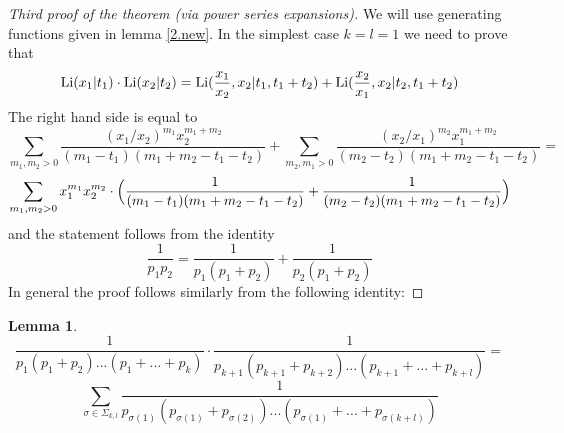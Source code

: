 \documentclass[10pt]{article}
\newtheorem{lemma}[theorem]{Lemma}
\begin{document}
\begin{proof}[Third proof of the theorem (via power series expansions)]  We 
will use generating functions given in lemma \ref{2.new}.  In the simplest case $ k=l=1$  we need to prove that
$$
{\rm Li}(x_1|t_1) \cdot {\rm Li}(x_2|t_2) = {\rm Li}(\frac{x_1}{x_2},x_2|t_1,t_1+t_2) + {\rm Li}(\frac{x_2}{x_1},x_2|t_2,t_1+t_2) 
$$
The right hand side is equal to
$$
\sum_{m_1,m_2 >0}\frac{(x_1/x_2)^{m_1}x_2^{m_1 + m_2}}{(m_1 -t_1)(m_1 + m_2 - t_1 -t_2)} + 
\sum_{m_2,m_1 >0}\frac{(x_2/x_1)^{m_2}x_1^{m_1 + m_2}}{(m_2 -t_2)(m_1 + m_2 - t_1 -t_2)} =
$$
$$
\sum_{m_1,m_2 >0}x_1^{m_1}x_2^{m_2} \cdot \Bigl(\frac{1}{(m_1 -t_1)(m_1 + m_2 - t_1 -t_2)} + \frac{1}{(m_2 -t_2 )(m_1 + m_2 - t_1 -t_2)}\Bigr)
$$
and the statement follows from the identity
$$
\frac{1}{p_1p_2} = \frac{1}{p_1( p_1 + p_2)} + \frac{1}{p_2( p_1 + p_2) }
$$
In general the proof follows similarly from the following identity:


\end{proof}

\begin{lemma}
\begin{equation} \label{A3}
\frac{1}{p_1( p_1 + p_2) ... ( p_1 + ... + p_k)} \cdot \frac{1}{p_{k+1}( p_{k+1}  + p_{k+2}) ... ( p_{k+1}   + ... + p_{k+l})} = 
\end{equation} 
$$
\sum_{\sigma \in \Sigma_{k,l}} \frac{1}{p_{\sigma(1)}( p_{\sigma(1)} + p_{\sigma(2)} ) ... ( p_{\sigma(1)} + ... + p_{\sigma(k+l)} )}
$$
\end{lemma}
\end{document}
